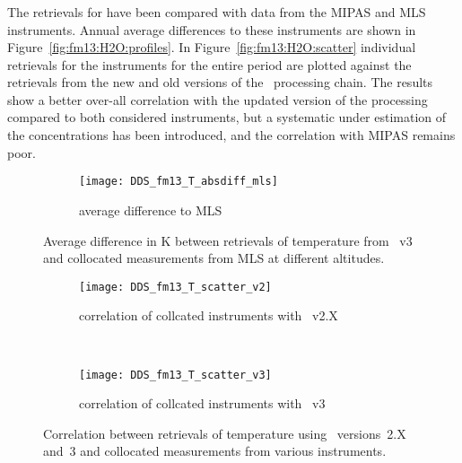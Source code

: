 \subsubsection{}
\label{sec:fm13:comparison:H2O}
The retrievals for  have been compared with data from the MIPAS and
MLS instruments. Annual average differences to these instruments are shown in
Figure~\ref{fig:fm13:H2O:profiles}. In Figure~\ref{fig:fm13:H2O:scatter}
individual retrievals for the instruments for the entire period are plotted
against the retrievals from the new and old versions of the \smr\ processing
chain. The results show a better over-all correlation with the updated version
of the processing compared to both considered instruments, but a systematic
under estimation of the concentrations has been introduced, and the correlation
with MIPAS remains poor.



\begin{figure}[htpb]
    \centering
    \begin{subfigure}[b]{0.49\textwidth}
        \texttt{[image: DDS\_fm13\_T\_absdiff\_mls]}
        \caption{average difference to MLS}
        \label{fig:fm13:T:profiles:MLS}
    \end{subfigure}
    \caption{Average difference in K between retrievals of temperature from
    \smr~v3 and collocated measurements from MLS at different altitudes.}
    \label{fig:fm13:T:profiles}
\end{figure}

\begin{figure}[htpb]
    \centering
    \begin{subfigure}[b]{0.49\textwidth}
        \texttt{[image: DDS\_fm13\_T\_scatter\_v2]}
        \caption{correlation of collcated instruments with \smr~v2.X}
        \label{fig:fm13:T:scatter:v2}
    \end{subfigure}
    \,
    \begin{subfigure}[b]{0.49\textwidth}
        \texttt{[image: DDS\_fm13\_T\_scatter\_v3]}
        \caption{correlation of collcated instruments with \smr~v3}
        \label{fig:fm13:T:scatter:v3}
    \end{subfigure}
    \caption{Correlation between retrievals of temperature using \smr\
    versions~2.X and~3 and collocated measurements from various instruments.}
    \label{fig:fm13:T:scatter}
\end{figure}

